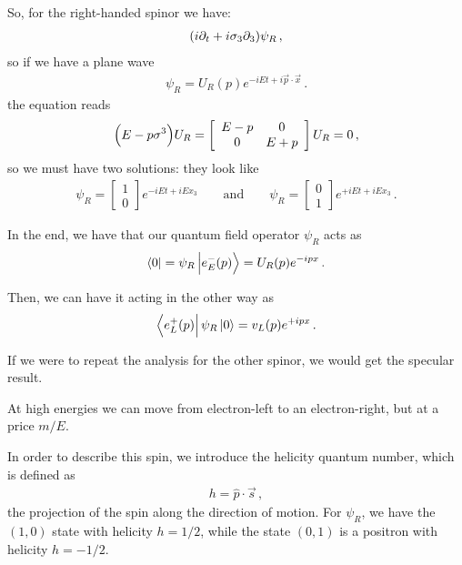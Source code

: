 \documentclass[main.tex]{subfiles}
\begin{document}
So, for the right-handed spinor we have:
%
\begin{align}
\qty(i \partial_{t} + i \sigma_{3} \partial_3 ) \psi_{R}
\,,
\end{align}
%
so if we have a plane wave 
%
\begin{align}
\psi_{R} = U_R (p) e^{-iEt + i \vec{p} \cdot \vec{x}}
\,.
\end{align}
%
the equation reads 
%
\begin{align}
\qty(E - p \sigma^{3}) U_R = \left[\begin{array}{cc}
E-p & 0 \\ 
0 & E+p
\end{array}\right] U_{R} = 0
\,,
\end{align}
%
so we must have two solutions: they look like 
%
\begin{align}
\psi_{R} = \left[\begin{array}{c}
1 \\ 
0
\end{array}\right] e^{-i Et + i E x_3 }
\qquad \text{and} \qquad
\psi_{R} = \left[\begin{array}{c}
0 \\ 
1
\end{array}\right] e^{+i Et + i E x_3 }  
\,.
\end{align}

In the end, we have that our quantum field operator \(\psi_{R}\) acts as 
%
\begin{align}
\bra{0} = \psi_{R} \ket{e^{-}_{E} (p)} = U_R(p) e^{-ipx}
\,.
\end{align}

Then, we can have it acting in the other way as 
%
\begin{align}
\bra{e^{+}_{L}(p)} \psi_{R} \ket{0} = v_L (p) e^{+ipx}
\,.
\end{align}

If we were to repeat the analysis for the other spinor, we would get the specular result. 

At high energies we can move from electron-left to an electron-right, but at a price \(m / E\). 

In order to describe this spin, we introduce the helicity quantum number, which is defined as 
%
\begin{align}
h = \hat{p} \cdot \vec{s}
\,,
\end{align}
%
the projection of the spin along the direction of motion. 
For \(\psi_{R}\), we have the \((1,0)\) state with helicity \(h = 1/2\), while the state \((0,1)\) is a positron with helicity \(h = - 1/2\). 
\end{document}
